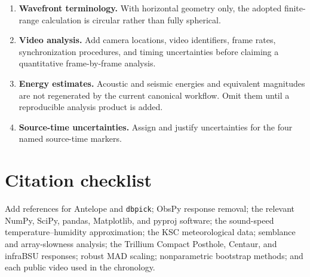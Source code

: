 \documentclass[12pt]{article}
\begin{document}
\begin{enumerate}[leftmargin=*]
  \item \textbf{Wavefront terminology.} With horizontal geometry only, the
  adopted finite-range calculation is circular rather than fully spherical.

  \item \textbf{Video analysis.} Add camera locations, video identifiers, frame
  rates, synchronization procedures, and timing uncertainties before claiming a
  quantitative frame-by-frame analysis.

  \item \textbf{Energy estimates.} Acoustic and seismic energies and equivalent
  magnitudes are not regenerated by the current canonical workflow. Omit them
  until a reproducible analysis product is added.

  \item \textbf{Source-time uncertainties.} Assign and justify uncertainties
  for the four named source-time markers.
\end{enumerate}

\section*{Citation checklist}

Add references for Antelope and \texttt{dbpick}; ObsPy response removal; the
relevant NumPy, SciPy, pandas, Matplotlib, and pyproj software; the sound-speed
temperature--humidity approximation; the KSC meteorological data; semblance and
array-slowness analysis; the Trillium Compact Posthole, Centaur, and infraBSU
responses; robust MAD scaling; nonparametric bootstrap methods; and each public
video used in the chronology.
\end{document}
